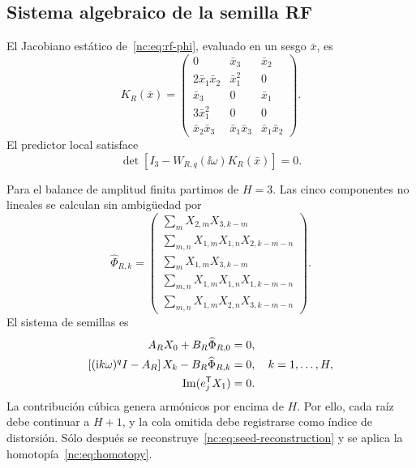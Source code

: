 \subsection{Sistema algebraico de la semilla RF}

El Jacobiano estático de~\eqref{nc:eq:rf-phi}, evaluado en un sesgo \(\bar x\), es
\begin{equation}
 K_R(\bar x)=
 \begin{pmatrix}
 0&\bar x_3&\bar x_2\\
 2\bar x_1\bar x_2&\bar x_1^2&0\\
 \bar x_3&0&\bar x_1\\
 3\bar x_1^2&0&0\\
 \bar x_2\bar x_3&\bar x_1\bar x_3&\bar x_1\bar x_2
 \end{pmatrix}.
 \label{nc:eq:rf-k}
\end{equation}
El predictor local satisface
\begin{equation}
 \det\left[I_3-W_{R,q}(\ii\omega)K_R(\bar x)\right]=0.
 \label{nc:eq:rf-local-closure}
\end{equation}

Para el balance de amplitud finita partimos de \(H=3\). Las cinco
componentes no lineales se calculan sin ambigüedad por
\begin{equation}
 \widehat\Phi_{R,k}=
 \begin{pmatrix}
 \displaystyle\sum_m X_{2,m}X_{3,k-m}\\[5pt]
 \displaystyle\sum_{m,n}X_{1,m}X_{1,n}X_{2,k-m-n}\\[5pt]
 \displaystyle\sum_m X_{1,m}X_{3,k-m}\\[5pt]
 \displaystyle\sum_{m,n}X_{1,m}X_{1,n}X_{1,k-m-n}\\[5pt]
 \displaystyle\sum_{m,n}X_{1,m}X_{2,n}X_{3,k-m-n}
 \end{pmatrix}.
 \label{nc:eq:rf-fourier-phi}
\end{equation}
El sistema de semillas es
\begin{align}
 A_RX_0+B_R\widehat\Phi_{R,0}&=0,\\
 \left[(\mathrm{i} k\omega)^qI-A_R\right]X_k
 -B_R\widehat\Phi_{R,k}&=0,
 \quad k=1,\ldots,H,\\
 \operatorname{Im}(e_j^{\mathsf T} X_1)&=0.
 \label{nc:eq:rf-hb-system}
\end{align}
La contribución cúbica genera armónicos por encima de \(H\). Por ello, cada raíz
debe continuar a \(H+1\), y la cola omitida debe registrarse como índice de
distorsión. Sólo después se reconstruye~\eqref{nc:eq:seed-reconstruction} y se
aplica la homotopía~\eqref{nc:eq:homotopy}.

